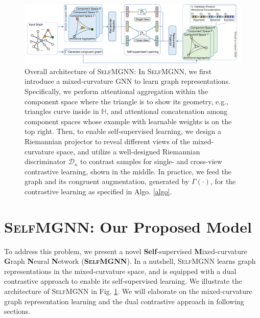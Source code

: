 

\begin{figure}
\centering
    \includegraphics[width=1\linewidth]{sample9}
    \caption{Overall architecture of \textsc{SelfMGNN}: \footnotesize{In \textsc{SelfMGNN}, we first introduce a mixed-curvature GNN to learn graph representations. 
    Specifically, we perform attentional aggregation within the component space where the triangle is to show its geometry, e.g., triangles curve inside in $\mathbb H$,  and attentional concatenation among component spaces whose example with learnable weights is on the top right. 
    Then, to enable self-supervised learning, we design a Riemannian projector to reveal different views of the mixed-curvature space, and utilize a well-designed Riemannian discriminator $\mathcal D_\kappa$ to contrast samples for single- and cross-view contrastive learning, shown in the middle. 
    In practice, we feed the graph and its congruent augmentation, generated by $\Gamma(\cdot)$, for the contrastive learning as specified in Algo. \ref{algo}. }}
    \label{illu}
\end{figure}



\section{\textsc{SelfMGNN}: Our Proposed Model}


To address this problem, we present a novel \textbf{Self}-supervised \textbf{M}ixed-curvature \textbf{G}raph \textbf{N}eural \textbf{N}etwork (\textbf{\textsc{SelfMGNN}}).
In a nutshell, 
\textsc{SelfMGNN} learns graph representations in the mixed-curvature space, 
and is equipped with a dual contrastive approach to enable its self-supervised learning. 
We illustrate the architecture of \textsc{SelfMGNN} in Fig. \ref{illu}.
We will elaborate on the mixed-curvature graph representation learning and the dual contrastive approach in following sections.

